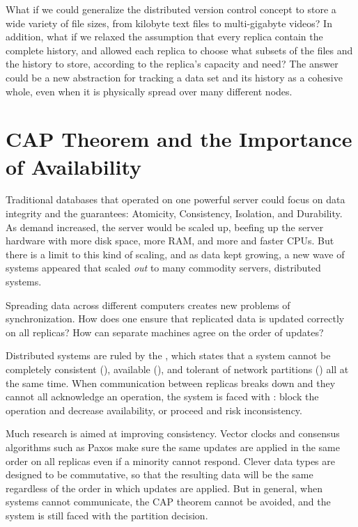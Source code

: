 What if we could generalize the distributed version control concept to store a
wide variety of file sizes, from kilobyte text files to multi-gigabyte videos?
In addition, what if we relaxed the assumption that every replica contain the
complete history, and allowed each replica to choose what subsets of the files
and the history to store, according to the replica's capacity and need? The
answer could be a new abstraction for tracking a data set and its history as a
cohesive whole, even when it is physically spread over many different nodes.

%



\section{CAP Theorem and the Importance of Availability}

Traditional databases that operated on one powerful server could focus on data
integrity and the  guarantees: Atomicity, Consistency, Isolation,
and Durability. As demand increased, the server would be scaled up, beefing up
the server hardware with more disk space, more RAM, and more and faster CPUs.
But there is a limit to this kind of scaling, and as data kept growing, a new
wave of systems appeared that scaled \emph{out} to many commodity servers,
distributed systems.

Spreading data across different computers creates new problems of
synchronization. How does one ensure that replicated data is updated correctly
on all replicas? How can separate machines agree on the order of updates?

Distributed systems are ruled by the  \cite{cap_origin},
which states that a system cannot be completely consistent (),
available (), and tolerant of network partitions () all at
the same time. When communication between replicas breaks down and they cannot
all acknowledge an operation, the system is faced with : block the operation and decrease availability, or proceed and risk
inconsistency\cite{cap_years_later}.

Much research is aimed at improving consistency. Vector
clocks\cite{lamport_ordering} and consensus algorithms such as
Paxos\cite{paxos_made_simple,paxos_made_moderately_complex} make sure the same
updates are applied in the same order on all replicas even if a minority cannot
respond. Clever data types are designed to be commutative, so that the resulting
data will be the same regardless of the order in which updates are
applied\cite{crdt_orig}. But in general, when systems cannot communicate, the
CAP theorem cannot be avoided\cite{cap_proof}, and the system is still faced
with the partition decision.

